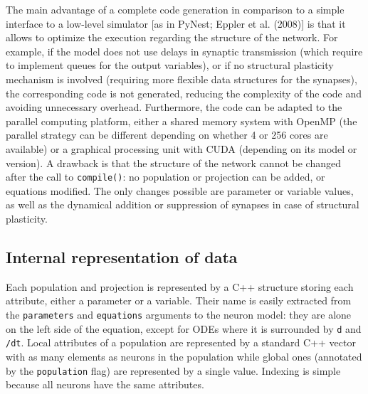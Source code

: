 \documentclass[
  11pt,
  a4paper,
]{scrbook}
\begin{document}
The main advantage of a complete code generation in comparison to a
simple interface to a low-level simulator {[}as in PyNest; Eppler et al.
(2008){]} is that it allows to optimize the execution regarding the
structure of the network. For example, if the model does not use delays
in synaptic transmission (which require to implement queues for the
output variables), or if no structural plasticity mechanism is involved
(requiring more flexible data structures for the synapses), the
corresponding code is not generated, reducing the complexity of the code
and avoiding unnecessary overhead. Furthermore, the code can be adapted
to the parallel computing platform, either a shared memory system with
OpenMP (the parallel strategy can be different depending on whether 4 or
256 cores are available) or a graphical processing unit with CUDA
(depending on its model or version). A drawback is that the structure of
the network cannot be changed after the call to \texttt{compile()}: no
population or projection can be added, or equations modified. The only
changes possible are parameter or variable values, as well as the
dynamical addition or suppression of synapses in case of structural
plasticity.

\subsection{Internal representation of
data}\label{sec-internal-representation-of-data}

Each population and projection is represented by a C++ structure storing
each attribute, either a parameter or a variable. Their name is easily
extracted from the \texttt{parameters} and \texttt{equations} arguments
to the neuron model: they are alone on the left side of the equation,
except for ODEs where it is surrounded by \texttt{d} and \texttt{/dt}.
Local attributes of a population are represented by a standard C++
vector with as many elements as neurons in the population while global
ones (annotated by the \texttt{population} flag) are represented by a
single value. Indexing is simple because all neurons have the same
attributes.
\end{document}
